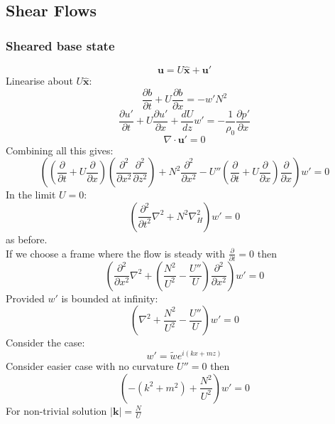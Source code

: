 \documentclass{article}
\begin{document}
\subsection{Shear Flows}
\subsubsection{Sheared base state}
$$
\bm u = U \hat{\bm x} + \bm u'
$$
Linearise about $U\hat{\bm x}$:
$$
\frac{\partial b}{\partial t} + U \frac{\partial b}{\partial x}  = - w' N^2
$$
$$
\frac{\partial u'}{\partial t} + U \frac{\partial u'}{\partial x} + \frac{dU}{dz} w' = - \frac{1}{\rho_0} \frac{\partial p'}{\partial x}
$$
$$
\nabla \cdot \bm u'=0
$$
Combining all this gives:
$$
\left( ( \frac{\partial}{\partial t} + U \frac{\partial}{\partial x}) ( \frac{\partial^2}{\partial x^2} \frac{\partial ^2}{\partial z^2}) + N^2 \frac{\partial^2}{\partial x^2} - U'' ( \frac{\partial}{\partial t} + U \frac{\partial}{\partial x}) \frac{\partial }{\partial x} \right) w' = 0
$$
In the limit $U = 0$:
$$
( \frac{\partial^2}{\partial t^2} \nabla^2 + N^2 \nabla_H^2 ) w' = 0
$$
as before. \\
If we choose a frame where the flow is steady with $\frac{\partial}{\partial t} = 0$ then
$$
(\frac{\partial^2}{\partial x^2} \nabla^2 + ( \frac{N^2}{U^2} - \frac{U''}{U}) \frac{\partial ^2}{\partial x^2} ) w' = 0
$$
Provided $w'$ is bounded at infinity:
$$
(\nabla^2 + \frac{N^2}{U^2} - \frac{U''}{U}) w' = 0
$$
Consider the case:
$$
w' = \tilde w e^{i(kx + mz)}
$$
Consider easier case with no curvature $U'' = 0$ then
$$
( - (k^2 + m^2) + \frac{N^2}{U^2}) w' = 0
$$
For non-trivial solution $|\bm k| = \frac{N}{U}$ \\\\
\end{document}
